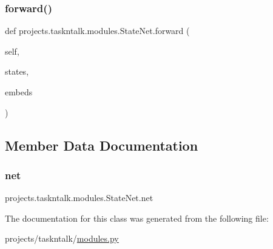 \subsubsection{\texorpdfstring{forward()}{forward()}}
{\footnotesize\ttfamily def projects.\+taskntalk.\+modules.\+State\+Net.\+forward (\begin{DoxyParamCaption}\item[{}]{self,  }\item[{}]{states,  }\item[{}]{embeds }\end{DoxyParamCaption})}



\subsection{Member Data Documentation}
\mbox{\label{classprojects_1_1taskntalk_1_1modules_1_1StateNet_a4499c3c6f15bc68c514202ed019f4eff}} 
\subsubsection{\texorpdfstring{net}{net}}
{\footnotesize\ttfamily projects.\+taskntalk.\+modules.\+State\+Net.\+net}



The documentation for this class was generated from the following file\+:\begin{DoxyCompactItemize}
\item 
projects/taskntalk/\hyperlink{projects_2taskntalk_2modules_8py}{modules.\+py}\end{DoxyCompactItemize}
